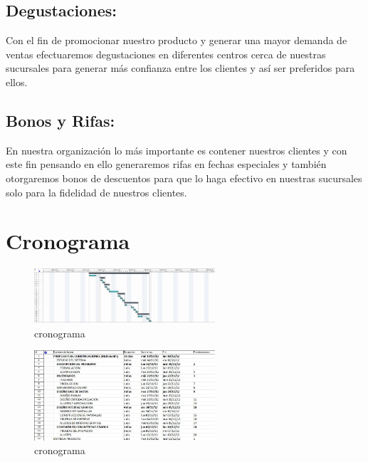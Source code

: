 \subsection{Degustaciones:} Con el fin de promocionar nuestro producto y generar una mayor demanda de ventas  efectuaremos degustaciones en diferentes centros cerca de nuestras sucursales para generar m\'as confianza entre los clientes y as\'i ser preferidos para ellos.
%
\subsection{Bonos y Rifas:} En nuestra  organizaci\'on lo m\'as importante es contener nuestros clientes y con este fin pensando en ello generaremos rifas en fechas especiales y tambi\'en otorgaremos bonos de descuentos para que lo haga efectivo en nuestras sucursales solo para la fidelidad de nuestros clientes.%

\section{Cronograma}
\begin{figure}[htbp]
	\centering
		\includegraphics[width=0.60\textwidth]{images/cronograma1.jpg}
	\caption{cronograma}
	\label{fig:Cronograma}
\end{figure}%
\begin{figure}[htbp]
	\centering
		\includegraphics[width=0.60\textwidth]{images/cronograma2.jpg}
	\caption{cronograma}
	\label{fig:Cronograma}
\end{figure}%